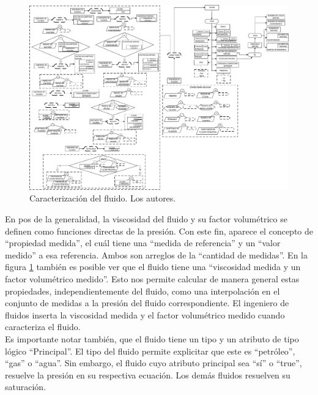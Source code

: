 \begin{figure}[b]
	\centering%
	\includegraphics[width=0.9\linewidth]{Fig/Fluid.pdf}%
	\caption{Caracterización del fluido. Los autores.} \label{fig:Fluid}
\end{figure}

En pos de la generalidad, la viscosidad del fluido y su factor volumétrico se definen como funciones directas de la presión. Con este fin, aparece el concepto de ``propiedad medida'', el cuál tiene una ``medida de referencia'' y un ``valor medido'' a esa referencia. Ambos son arreglos de la ``cantidad de medidas''. En la figura \ref{fig:Fluid} también es posible ver que el fluido tiene una ``viscosidad medida y un factor volumétrico medido''. Esto nos permite calcular de manera general estas propiedades, independientemente del fluido, como una interpolación en el conjunto de medidas a la presión del fluido correspondiente. El ingeniero de fluidos inserta la viscosidad medida y el factor volumétrico medido cuando caracteriza el fluido. \\

Es importante notar también, que el fluido tiene un tipo y un atributo de tipo lógico ``Principal''. El tipo del fluido permite explicitar que este es ``petróleo'', ``gas'' o ``agua''. Sin embargo, el fluido cuyo atributo principal sea ``sí'' o ``true'', resuelve la presión en su respectiva ecuación. Los demás fluidos resuelven su saturación. 

